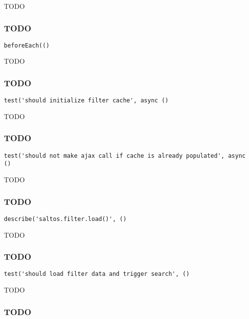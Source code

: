 \documentclass[a4paper]{article}
\begin{document}
TODO

\hypertarget{toc589}{}
\subsubsection{TODO}

\begin{lstlisting}
beforeEach(()
\end{lstlisting}

TODO

\hypertarget{toc590}{}
\subsubsection{TODO}

\begin{lstlisting}
test('should initialize filter cache', async ()
\end{lstlisting}

TODO

\hypertarget{toc591}{}
\subsubsection{TODO}

\begin{lstlisting}
test('should not make ajax call if cache is already populated', async ()
\end{lstlisting}

TODO

\hypertarget{toc592}{}
\subsubsection{TODO}

\begin{lstlisting}
describe('saltos.filter.load()', ()
\end{lstlisting}

TODO

\hypertarget{toc593}{}
\subsubsection{TODO}

\begin{lstlisting}
test('should load filter data and trigger search', ()
\end{lstlisting}

TODO

\hypertarget{toc594}{}
\subsubsection{TODO}
\end{document}
